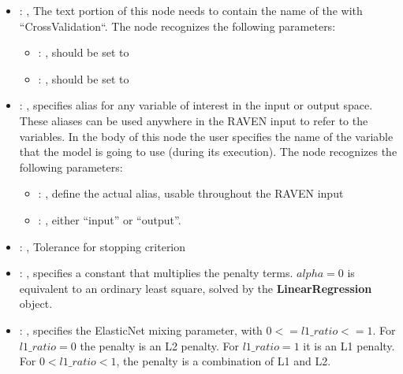\begin{itemize}
    \item {}: , 
      The text portion of this node needs to contain the name of the  with
               ``CrossValidation``.
      The  node recognizes the following parameters:
        \begin{itemize}
          \item {}: , 
            should be set to 
          \item {}: , 
            should be set to 
      \end{itemize}

    \item {}: , 
      specifies alias for         any variable of interest in the input or output space. These
      aliases can be used anywhere in the RAVEN input to         refer to the variables. In the body
      of this node the user specifies the name of the variable that the model is going to use
      (during its execution).
      The  node recognizes the following parameters:
        \begin{itemize}
          \item {}: , 
            define the actual alias, usable throughout the RAVEN input
          \item {}: , 
            either ``input'' or ``output''.
      \end{itemize}

    \item {}: , 
      Tolerance for stopping criterion

    \item {}: , 
      specifies a constant                                                  that multiplies the
      penalty terms.                                                  $alpha = 0$ is equivalent to
      an ordinary least square, solved by the
      \textbf{LinearRegression} object.

    \item {}: , 
      specifies the                                                  ElasticNet mixing parameter,
      with $0 <= l1\_ratio <= 1$.                                                  For $l1\_ratio =
      0$ the penalty is an L2 penalty.                                                  For
      $l1\_ratio = 1$ it is an L1 penalty.                                                  For $0 <
      l1\_ratio < 1$, the penalty is a combination of L1 and L2.


\end{itemize}
